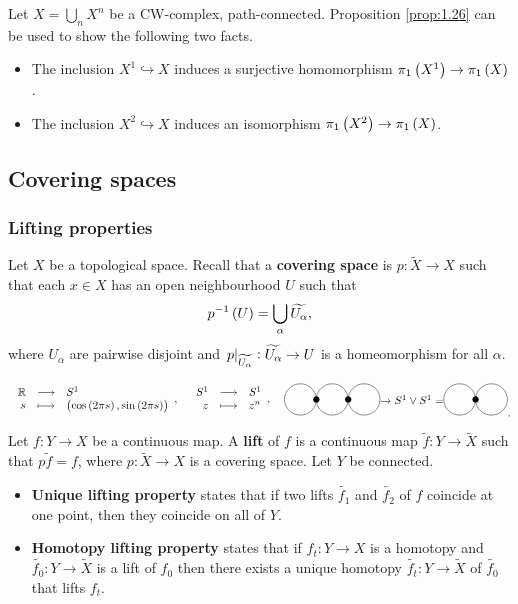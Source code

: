 \begin{remark*}
Let $ X = \bigcup_n X^n $ be a CW-complex, path-connected. Proposition \ref{prop:1.26} can be used to show the following two facts.
\begin{itemize}
\item The inclusion $ X^1 \hookrightarrow X $ induces a surjective homomorphism $ \pi_1\br{X^1} \to \pi_1\br{X} $.
\item The inclusion $ X^2 \hookrightarrow X $ induces an isomorphism $ \pi_1\br{X^2} \to \pi_1\br{X} $.
\end{itemize}
\end{remark*}

\pagebreak

\subsection{Covering spaces}

\subsubsection{Lifting properties}

Let $ X $ be a topological space. Recall that a \textbf{covering space} is $ p : \widetilde{X} \to X $ such that each $ x \in X $ has an open neighbourhood $ U $ such that
$$ p^{-1}\br{U} = \bigcup_\alpha \widetilde{U_\alpha}, $$
where $ U_\alpha $ are pairwise disjoint and $ \left. p \right|_{\widetilde{U_\alpha}} : \widetilde{U_\alpha} \to U $ is a homeomorphism for all $ \alpha $.

\begin{example*}
$$
\begin{tikzpicture}
\draw (-5, 0) node{$ \function{\R}{S^1}{s}{\br{\cos\br{2\pi s}, \sin\br{2\pi s}}}, \quad \function{S^1}{S^1}{z}{z^n}, $};
\draw (0, 0) circle (0.5);
\fill (0.5, 0) circle (0.1);
\draw (1, 0) circle (0.5);
\fill (1.5, 0) circle (0.1);
\draw (2, 0) circle (0.5);
\draw (3.5, 0) node{$ \to S^1 \vee S^1 = $};
\draw (5, 0) circle (0.5);
\fill (5.5, 0) circle (0.1);
\draw (6, 0) circle (0.5);
\end{tikzpicture}.
$$
\end{example*}

Let $ f : Y \to X $ be a continuous map. A \textbf{lift} of $ f $ is a continuous map $ \widetilde{f} : Y \to \widetilde{X} $ such that $ p\widetilde{f} = f $, where $ p : \widetilde{X} \to X $ is a covering space. Let $ Y $ be connected.
\begin{itemize}
\item \textbf{Unique lifting property} states that if two lifts $ \widetilde{f_1} $ and $ \widetilde{f_2} $ of $ f $ coincide at one point, then they coincide on all of $ Y $.
\item \textbf{Homotopy lifting property} states that if $ f_t : Y \to X $ is a homotopy and $ \widetilde{f_0} : Y \to \widetilde{X} $ is a lift of $ f_0 $ then there exists a unique homotopy $ \widetilde{f_t} : Y \to \widetilde{X} $ of $ \widetilde{f_0} $ that lifts $ f_t $.
\end{itemize}

